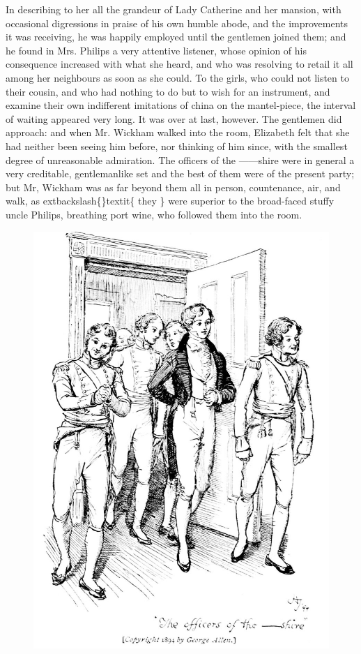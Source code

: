 \documentclass[10pt]{book}
\begin{document}
   In describing to her all the grandeur of Lady Catherine and her mansion,
with occasional digressions in praise of his own humble abode, and the
improvements it was receiving, he was happily employed until the
gentlemen joined them; and he found in Mrs. Philips a very attentive
listener, whose opinion of his consequence increased with what she
heard, and who was resolving to retail it all among her neighbours as
soon as she could. To the girls, who could not listen to their cousin,
and who had nothing to do but to wish for an instrument, and examine
their own indifferent imitations of china on the mantel-piece, the
interval of waiting appeared very long. It was over at last, however.
The gentlemen did approach: and when Mr. Wickham walked into the room,
Elizabeth felt that she had neither been seeing him before, nor thinking
of him since, with the smallest degree of
   unreasonable admiration. The
officers of the ——shire were in general a very creditable,
gentlemanlike set and the best of them were of the present party; but
Mr, Wickham was as far beyond them all in person, countenance, air, and
walk, as
   	extbackslash\{\}textit\{
    they
   \}
   were superior to the broad-faced stuffy uncle Philips,
breathing port wine, who followed them into the room.
  

\begin{figure}[h]
\centering
\includegraphics[width=\linewidth]{images/i_126.jpg}
\end{figure}
\end{document}
